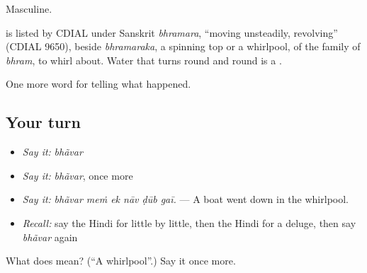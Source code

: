 Masculine.

\begin{cousinweb}
is listed by CDIAL under Sanskrit \emph{bhramara}, \textquotedblleft{}moving unsteadily, revolving\textquotedblright{} (CDIAL 9650), beside \emph{bhramaraka}, a spinning top or a whirlpool, of the family of \emph{bhram}, to whirl about. Water that turns round and round is a \textbf{}.
\end{cousinweb}

\begin{grammarlens}[title={What you've built}]
One more word for telling what happened.
\end{grammarlens}

\subsection*{Your turn}
\begin{itemize}
\raggedright
  \item \emph{Say it:} \emph{bhãvar}
  \item \emph{Say it:} \emph{bhãvar}, once more
  \item \emph{Say it:} \emph{bhãvar meṁ ek nāv ḍūb gaī.} — A boat went down in the whirlpool.
  \item \emph{Recall:} say the Hindi for little by little, then the Hindi for a deluge, then say \emph{bhãvar} again
\end{itemize}

\begin{tcolorbox}[breakable,colback=teal!4,colframe=teal!35!black,title={Before you move on}]
What does  mean? (\textquotedblleft{}A whirlpool\textquotedblright{}.) Say it once more.
\end{tcolorbox}
